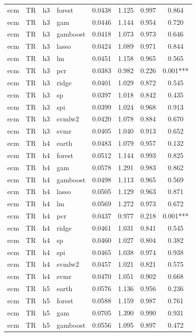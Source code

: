 \begin{ThreePartTable}
\begin{longtable}[t]{llclcccc}
ecm & TR & h3 & forest & 0.0438 & 1.125 & 0.997 & 0.864\\
ecm & TR & h3 & gam & 0.0446 & 1.144 & 0.954 & 0.720\\
ecm & TR & h3 & gamboost & 0.0418 & 1.073 & 0.973 & 0.646\\
ecm & TR & h3 & lasso & 0.0424 & 1.089 & 0.971 & 0.844\\
ecm & TR & h3 & lm & 0.0451 & 1.158 & 0.965 & 0.565\\
ecm & TR & h3 & pcr & 0.0383 & 0.982 & 0.226 & 0.001***\\
ecm & TR & h3 & ridge & 0.0401 & 1.029 & 0.872 & 0.545\\
ecm & TR & h3 & sp & 0.0397 & 1.018 & 0.842 & 0.435\\
ecm & TR & h3 & spi & 0.0399 & 1.024 & 0.968 & 0.913\\
ecm & TR & h3 & svmlw2 & 0.0420 & 1.078 & 0.884 & 0.670\\
ecm & TR & h3 & svmr & 0.0405 & 1.040 & 0.913 & 0.652\\
\addlinespace
ecm & TR & h4 & earth & 0.0483 & 1.079 & 0.957 & 0.132\\
ecm & TR & h4 & forest & 0.0512 & 1.144 & 0.993 & 0.825\\
ecm & TR & h4 & gam & 0.0578 & 1.291 & 0.983 & 0.862\\
ecm & TR & h4 & gamboost & 0.0498 & 1.113 & 0.965 & 0.569\\
ecm & TR & h4 & lasso & 0.0505 & 1.129 & 0.963 & 0.871\\
ecm & TR & h4 & lm & 0.0569 & 1.272 & 0.973 & 0.672\\
ecm & TR & h4 & pcr & 0.0437 & 0.977 & 0.218 & 0.001***\\
ecm & TR & h4 & ridge & 0.0461 & 1.031 & 0.841 & 0.545\\
ecm & TR & h4 & sp & 0.0460 & 1.027 & 0.804 & 0.382\\
ecm & TR & h4 & spi & 0.0465 & 1.038 & 0.974 & 0.938\\
ecm & TR & h4 & svmlw2 & 0.0457 & 1.021 & 0.821 & 0.575\\
ecm & TR & h4 & svmr & 0.0470 & 1.051 & 0.902 & 0.668\\
\addlinespace
ecm & TR & h5 & earth & 0.0576 & 1.136 & 0.956 & 0.236\\
ecm & TR & h5 & forest & 0.0588 & 1.159 & 0.987 & 0.761\\
ecm & TR & h5 & gam & 0.0705 & 1.390 & 0.990 & 0.931\\
ecm & TR & h5 & gamboost & 0.0556 & 1.095 & 0.897 & 0.472\\

\end{longtable}
\end{ThreePartTable}
